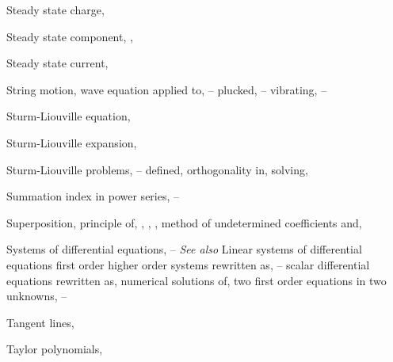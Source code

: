 \begin{theindex}
  \item Steady state charge, \pageref{eq:6.3.17}

  \item Steady state component, \pageref{eq:6.2.18}, \pageref{eq:8.6.21}

  \item Steady state current, \pageref{example:6.3.2}

  \item String motion, wave equation applied to, \pageref{eq:12.2.1}--\pageref{eq:12.2.21}
    \subitem plucked, \pageref{eq:12.2.21}--\pageref{exer:12.2.1}
    \subitem vibrating, \pageref{eq:12.2.1}--\pageref{eq:12.2.21}

  \item Sturm-Liouville equation, \pageref{eq:13.2.10}

  \item Sturm-Liouville expansion, \pageref{thmtype:13.2.7}

  \item Sturm-Liouville problems, \pageref{eq:13.2.1}--\pageref{exer:13.2.32}
    \subitem defined, \pageref{example:13.2.1}
    \subitem orthogonality in, \pageref{thmtype:13.2.6}
    \subitem solving, \pageref{example:13.2.1}

  \item Summation index in power series, \pageref{eq:7.1.11}--\pageref{example:7.1.4}

  \item Superposition, principle of, \pageref{exer:2.1.46}, \pageref{thmtype:5.3.3}, \pageref{example:5.4.7}, \pageref{thmtype:9.1.6}
    \subitem method of undetermined coefficients and, \pageref{eq:5.4.17}

  \item Systems of differential equations, \pageref{example:10.1.1}--\pageref{exer:10.2.1} \emph{See also} Linear systems of differential equations
    \subitem first order
      \subsubitem higher order systems rewritten as, \pageref{eq:7.2.15}--\pageref{example:10.1.5}
      \subsubitem scalar differential equations rewritten as, \pageref{example:10.1.6}
    \subitem numerical solutions of, \pageref{exer:10.1.1}
    \subitem two first order equations in two unknowns, \pageref{example:10.1.1}--\pageref{eq:10.1.12} 

  \item Tangent lines, \pageref{example:4.5.6}

  \item Taylor polynomials, \pageref{thmtype:7.1.5}


\end{theindex}

